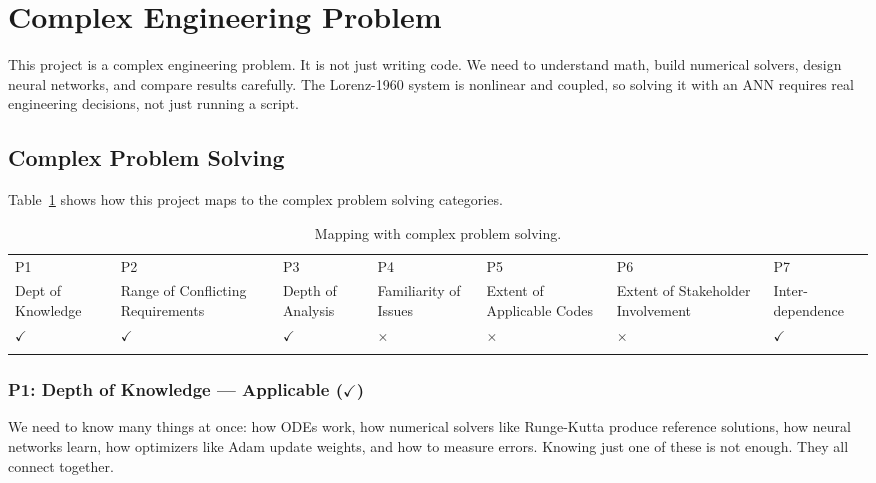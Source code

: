 \section{Complex Engineering Problem}

This project is a complex engineering problem. It is not just writing code. We need to understand math, build numerical solvers, design neural networks, and compare results carefully. The Lorenz-1960 system is nonlinear and coupled, so solving it with an ANN requires real engineering decisions, not just running a script.

\subsection{Complex Problem Solving}

Table~\ref{tab:p_solve} shows how this project maps to the complex problem solving categories.

\begin{center}
    \begin{table}[ht]
        \centering
        \caption{Mapping with complex problem solving.}
        \begin{tabular}{|p{}|p{}|p{}|p{}|p{}|p{}|p{}|}
        \hline
        P1& P2& P3& P4& P5& P6& P7\\
        Dept of Knowledge & Range of Conflicting Requirements & Depth of Analysis & Familiarity of Issues & Extent of Applicable Codes & Extent of Stakeholder Involvement & Inter-dependence\\
        \hline 
        $\checkmark$ & $\checkmark$ & $\checkmark$ & $\times$ & $\times$ & $\times$ & $\checkmark$\\
        &&&&&&\\
        \hline 
        \end{tabular}
        \label{tab:p_solve}
    \end{table}
\end{center}

\subsubsection{P1: Depth of Knowledge --- Applicable ($\checkmark$)}

We need to know many things at once: how ODEs work, how numerical solvers like Runge-Kutta produce reference solutions, how neural networks learn, how optimizers like Adam update weights, and how to measure errors. Knowing just one of these is not enough. They all connect together.


